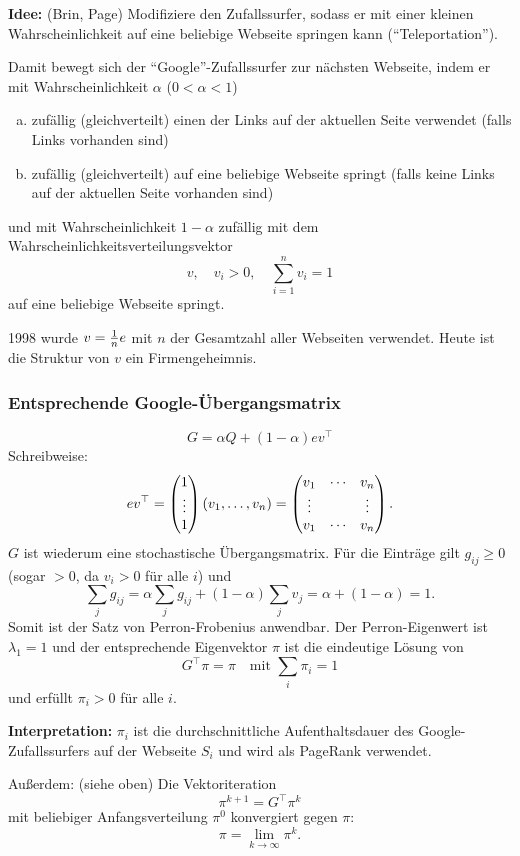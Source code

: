 \textbf{Idee:} (Brin, Page) Modifiziere den Zufallssurfer, sodass er mit einer
kleinen Wahrscheinlichkeit auf eine beliebige Webseite springen kann
(``Teleportation'').

Damit bewegt sich der ``Google''-Zufallssurfer zur nächsten Webseite, indem er
mit Wahrscheinlichkeit $\alpha$ ($0 < \alpha < 1$)
\begin{enumerate}[a)]
\item zufällig (gleichverteilt) einen der Links auf der aktuellen Seite
  verwendet (falls Links vorhanden sind)
\item zufällig (gleichverteilt) auf eine beliebige Webseite springt (falls
  keine Links auf der aktuellen Seite vorhanden sind)
\end{enumerate}
und mit Wahrscheinlichkeit $1 - \alpha$ zufällig mit dem
Wahrscheinlichkeitsverteilungsvektor
\[ v, \quad v_i > 0, \quad \sum_{i=1}^n v_i = 1 \]
auf eine beliebige Webseite springt.

1998 wurde $v = \frac{1}{n} e$ mit $n$ der Gesamtzahl aller Webseiten verwendet.
Heute ist die Struktur von $v$ ein Firmengeheimnis.

\subsubsection*{Entsprechende Google-Übergangsmatrix}
\[ G = \alpha Q + (1-\alpha) e v^\top \]
Schreibweise:
\[ ev^\top = \begin{pmatrix}1 \\ \vdots \\ 1\end{pmatrix} (v_1, \ldots, v_n) =
  \begin{pmatrix}
    v_1 & \cdots & v_n \\
    \vdots & & \vdots \\
    v_1 & \cdots & v_n
  \end{pmatrix}.
\]
$G$ ist wiederum eine stochastische Übergangsmatrix. Für die Einträge gilt
$g_{ij} \ge 0$ (sogar $> 0$, da $v_i > 0$ für alle $i$) und
\[ \sum_{j} g_{ij} = \alpha \sum_{j} g_{ij} + (1-\alpha) \sum_{j} v_j
  = \alpha + (1-\alpha) = 1. \]
Somit ist der Satz von Perron-Frobenius anwendbar. Der Perron-Eigenwert ist
$\lambda_1 = 1$ und der entsprechende Eigenvektor $\pi$ ist die eindeutige
Lösung von
\[ G^\top \pi = \pi \quad \text{mit } \sum_{i} \pi_i = 1 \]
und erfüllt $\pi_i > 0$ für alle $i$.

\textbf{Interpretation:} $\pi_i$ ist die durchschnittliche Aufenthaltsdauer des
Google-Zufallssurfers auf der Webseite $S_i$ und wird als PageRank verwendet.

Außerdem: (siehe oben) Die Vektoriteration
\[ \pi^{k+1} = G^\top \pi^k \]
mit beliebiger Anfangsverteilung $\pi^0$  konvergiert gegen $\pi$:
\[ \pi = \lim_{k \to \infty} \pi^k. \]

